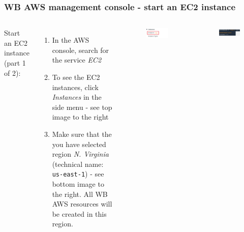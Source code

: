 \documentclass[aspectratio=169]{beamer} %
\begin{document}
\begin{frame}
	\frametitle{WB AWS management console - start an EC2 instance}

	\begin{columns}[c]


			Start an EC2 instance (part 1 of 2):
	
			\begin{enumerate}
				\item In the AWS console, search for the service \textit{EC2} 
				\item To see the EC2 instances, 
				click \textit{Instances} in the side menu - 
				see top image to the right 
				\item Make sure that the you have selected region
				\textit{N. Virginia} (technical name:
				\texttt{us-east-1}) - see bottom image to the right.
				All WB AWS resources will be created in this region.
			\end{enumerate}


			\begin{figure}
				\centering
				\includegraphics[width=.7\textwidth]{./img/ec2-1.png}
			\end{figure}		
			
			\begin{figure}
				\centering
				\includegraphics[width=.8\textwidth]{./img/aws-console-1.png}
			\end{figure}
	\end{columns}
\end{frame}
\end{document}
